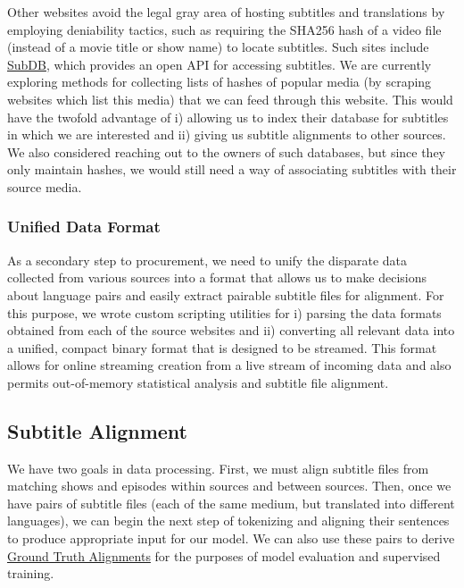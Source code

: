 \documentclass[twoside,twocolumn]{article}
\begin{document}
Other websites avoid the legal gray area of hosting subtitles and translations
by employing deniability tactics, such as requiring the SHA256 hash of a video
file (instead of a movie title or show name) to locate subtitles. Such sites
include \href{http://thesubdb.com/}{SubDB}, which provides an open API for
accessing subtitles. We are currently exploring methods for collecting lists of
hashes of popular media (by scraping websites which list this media) that we
can feed through this website. This would have the twofold advantage of
i) allowing us to index their database for subtitles in which we are interested
and ii) giving us subtitle alignments to other sources. We also considered
reaching out to the owners of such databases, but since they only maintain
hashes, we would still need a way of associating subtitles with their source
media.


\subsubsection{Unified Data Format}

As a secondary step to procurement, we need to unify the disparate data
collected from various sources into a format that allows us to make decisions
about language pairs and easily extract pairable subtitle files for alignment.
For this purpose, we wrote custom scripting utilities for i) parsing
the data formats obtained from each of the source websites and ii) converting
all relevant data into a unified, compact binary format that is designed to be
streamed. This format allows for online streaming creation from a live stream
of incoming data and also permits out-of-memory statistical analysis and
subtitle file alignment.


\subsection{Subtitle Alignment}
\label{subsec:subtitle-alignment}

We have two goals in data processing. First, we must align
subtitle files from matching shows and episodes within sources and between
sources. Then, once we have pairs of subtitle files (each of the same medium,
but translated into different languages), we can begin the next step of
tokenizing and aligning their sentences to produce appropriate input for
our model. We can also use these pairs to derive
\hyperref[subsec:ground-truth-alignments]{Ground Truth Alignments} for the
purposes of model evaluation and supervised training.
\end{document}
